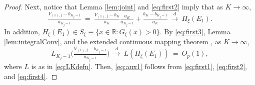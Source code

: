 \begin{proof}
Next, notice that Lemma \ref{lem:joint}
and \eqref{eq:first2} imply that as $K\to \infty$,
\begin{equation}
\tfrac{V_{(1),j}-b_{K_{j}-1}}{a_{K_{j}-1}}~=~\tfrac{V_{(1),j}-b_{K}}{a_{K}}\tfrac{ a_{K}}{a_{K_{j}-1}}+\tfrac{b_{K}-b_{K_{j}-1}}{a_{K}}~\overset{d}{\to }~ H_{\xi }( E_{1}). \label{eq:first3}
\end{equation}
In addition, $H_{\xi }( E_{1}) \in \bar{S}_{\xi} \equiv \{x \in \mathbb{R} : G_\xi(x)>0 \}$. By \eqref{eq:first3}, Lemma \ref{lem:integralConv}, and the extended continuous mapping theorem \citep[e.g.][Theorem 1.11.1]{vandervaart:1998}, as $K\to \infty$,
\begin{equation}
L_{K_{j}-1}\big( \tfrac{V_{(1),j}-b_{K_{j}-1}}{a_{K_{j}-1}}\big)~ \overset{d}{\to }~L( H_{\xi }( E_{1}) ) ~=~O_{p}( 1), \label{eq:first4}
\end{equation}
where $L$ is as in \eqref{eq:LKdefn}. Then, \eqref{eq:aux1} follows from \eqref{eq:first1}, \eqref{eq:first2}, and \eqref{eq:first4}.
\end{proof}


